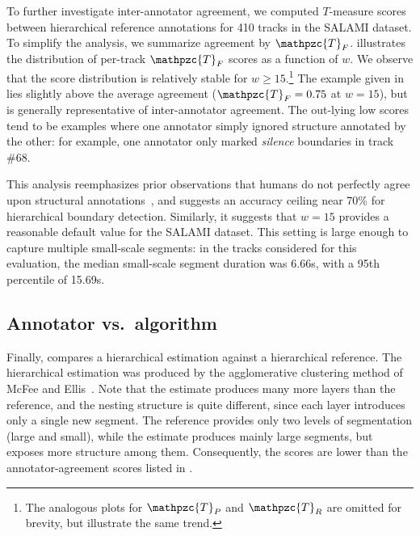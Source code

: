 \documentclass{article}
\def\shag{\ensuremath{\mathpzc{T}}}
\begin{document}
To further investigate inter-annotator agreement, we computed $T$-measure scores between hierarchical
reference annotations for 410 tracks in the SALAMI dataset.  To simplify the analysis, we
summarize agreement by $\shag_F$.  illustrates the distribution of
per-track $\shag_F$ scores as a function of $w$.  We observe that the score distribution is relatively stable
for $w \geq 15$.\footnote{The analogous plots for $\shag_P$ and $\shag_R$ are omitted for brevity, but illustrate the same
trend.} 
The example given in  lies slightly above the average agreement
($\shag_F = 0.75$ at $w=15$),
but is generally representative of inter-annotator agreement.
The out-lying low scores tend to be examples where one annotator simply ignored structure annotated
by the other: for example, one annotator only marked \emph{silence} boundaries in track \#68.

This analysis reemphasizes prior observations that humans do not perfectly agree upon structural
annotations~\cite{Smith2013}, and suggests an accuracy ceiling near 70\% for hierarchical boundary detection.
Similarly, it suggests that $w=15$ provides a reasonable default value for the SALAMI dataset.  This setting
is large enough to capture multiple small-scale segments: in the tracks considered for this evaluation, 
the median small-scale segment duration was 6.66s, with a 95th percentile of 15.69s.

\subsection{Annotator vs.\ algorithm}
Finally,  compares a hierarchical estimation against a hierarchical reference.
The hierarchical estimation was produced by the agglomerative clustering method of McFee and Ellis~\cite{McFee2014}.
Note that the estimate produces many more layers than the reference, and the nesting
structure is quite different, since each layer introduces only a single new segment.
The reference provides only two levels of segmentation (large and small), while the 
estimate produces mainly large segments, but exposes more structure among them.
Consequently, the scores are lower than the annotator-agreement scores listed in
.
\end{document}
